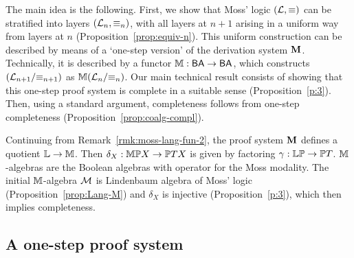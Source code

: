 \documentclass{book}
\begin{document}
The main idea is the following.  First, we show that Moss' logic
$(\mathcal{L},\equiv)$ can be stratified into layers
$(\mathcal{L}_n,\equiv_n)$, with all layers at $n+1$ arising in a
uniform way from layers at $n$ (Proposition~\ref{prop:equiv-n}).  This
uniform construction can be described by means of a `one-step version'
of the derivation system $\mathbf{M}$.  Technically, it is described by
a functor $\mathbb{M}:\mathsf{BA}\to\mathsf{BA}$, which constructs
$(\mathcal{L}_{n+1}/{\equiv_{n+1}})$ as
$\mathbb{M}(\mathcal{L}_{n}/{\equiv_{n}})$.  Our main technical result
consists of showing that this one-step proof system is complete in a
suitable sense (Proposition~\ref{p:3}).  Then, using a standard
argument, completeness follows from one-step completeness
(Proposition~\ref{prop:coalg-compl}).

\begin{remark}\label{rmk:stone-duality} 
  Continuing from Remark~\ref{rmk:moss-lang-fun-2}, the proof system
  $\mathbf{M}$ defines a quotient ${\mathbb{L}}\to\mathbb{M}$. Then
  $\delta_X:\mathbb{M}\mathbb{P} X\to\mathbb{P}T X$ is given by factoring
  $\gamma:{\mathbb{L}}\mathbb{P}\to\mathbb{P} T$.  $\mathbb{M}$-algebras are the
  Boolean algebras with operator for the Moss modality. The initial
  $\mathbb{M}$-algebra $\mathcal{M}$ is Lindenbaum algebra of Moss' logic
  (Proposition~\ref{prop:Lang-M}) and $\delta_X$ is injective
  (Proposition~\ref{p:3}), which then implies completeness.
\end{remark}

\subsection{A one-step proof system}
\end{document}
